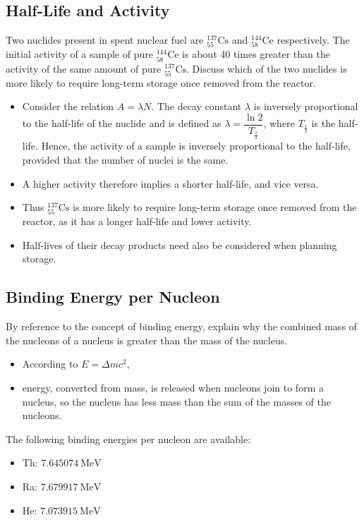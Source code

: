 \documentclass[a4paper,12pt]{article}
\newcommand{\atom}[3]{{}^{#1}_{#2}\text{#3}}
\begin{document}
\pagebreak

\subsection{Half-Life and Activity}

Two nuclides present in spent nuclear fuel are $\atom{137}{55}{Cs}$ and $\atom{144}{58}{Ce}$ respectively. The initial activity of a sample of pure $\atom{144}{58}{Ce}$ is about 40 times greater than the activity of the same amount of pure $\atom{137}{55}{Cs}$. Discuss which of the two nuclides is more likely to require long-term storage once removed from the reactor.
\begin{itemize}
  \item Consider the relation $A = \lambda N$. The decay constant $\lambda$ is inversely proportional to the half-life of the nuclide and is defined as $\lambda = \dfrac{\ln 2}{T_{\frac{1}{2}}}$, where $T_{\frac{1}{2}}$ is the half-life. Hence, the activity of a sample is inversely proportional to the half-life, provided that the number of nuclei is the same.
  \item A higher activity therefore implies a shorter half-life, and vice versa.
  \item Thus $\atom{137}{55}{Cs}$ is more likely to require long-term storage once removed from the reactor, as it has a longer half-life and lower activity.
  \item Half-lives of their decay products need also be considered when planning storage.
\end{itemize}

\pagebreak

\subsection{Binding Energy per Nucleon}

By reference to the concept of binding energy, explain why the
combined mass of the nucleons of a nucleus is greater than the
mass of the nucleus.
\begin{itemize}
  \item According to $E = \Delta mc^2$,
  \item energy, converted from mass, is released when nucleons join to form a nucleus, so the nucleus has less mass than the sum of the masses of the nucleons.
\end{itemize}

The following binding energies per nucleon are available:
\begin{itemize}
  \item Th: $\SI{7.645074}{\mega\electronvolt}$
  \item Ra: $\SI{7.679917}{\mega\electronvolt}$
  \item He: $\SI{7.073915}{\mega\electronvolt}$
\end{itemize}
\end{document}
